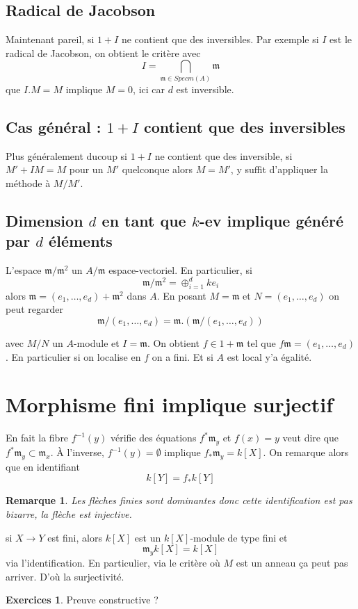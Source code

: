 \documentclass[a4paper,12pt]{book}
\newcommand{\m}{\mathfrak{m}}
\theoremstyle{plain}
\newtheorem{rem}{Remarque}
\theoremstyle{definition}
\newtheorem{exo}[subsection]{Exercices}
\theoremstyle{remark}
\begin{document}
\subsection{Radical de Jacobson}

Maintenant pareil, si $1+I$ ne contient que des inversibles. 
Par exemple si $I$ est le radical de Jacobson, on obtient le critère 
avec \[I=\bigcap_{\m\in Specm(A)} \m\]
que $I.M=M$ implique $M=0$, ici car $d$ est inversible.
\subsection{Cas général : $1+I$ contient que des inversibles}
Plus généralement ducoup si $1+I$
ne contient que des inversible, si $M'+IM=M$ pour un $M'$ quelconque 
alors $M=M'$, y suffit d'appliquer la méthode à $M/M'$.

\subsection{Dimension $d$ en tant que $k$-ev implique généré par
$d$ éléments}
L'espace $\m/\m^2$ un $A/\m$ espace-vectoriel. En particulier, si
\[\m/\m^2=\oplus_{i=1}^d ke_i\]
alors $\m=(e_1,\ldots,e_d)+\m^2$ dans $A$. En posant $M=\m$ et 
$N=(e_1,\ldots, e_d)$ on peut regarder
\[\m/(e_1,\ldots,e_d)=\m.(\m/(e_1,\ldots,e_d))\]

avec $M/N$ un $A$-module et $I=\m$. On obtient $f\in 1+\m$ tel que
$f\m=(e_1,\ldots,e_d)$. En particulier si on localise en $f$ on a fini.
Et si $A$ est local y'a égalité.

\section{Morphisme fini implique surjectif}
En fait la fibre $f^{-1}(y)$ vérifie des équations $f^*\m_y$ et 
$f(x)=y$ veut dire que $f^*\m_y\subset \m_x$. À l'inverse, 
$f^{-1}(y)=\emptyset$ implique $f_*\m_y=k[X]$.
On remarque alors que en identifiant 
\[k[Y]=f_*k[Y]\]
\begin{rem}
    Les flèches finies sont dominantes donc cette identification est pas
    bizarre, la flèche est injective.
\end{rem}
si $X\to Y$ est fini, alors $k[X]$ est un $k[X]$-module de type fini
et \[\m_yk[X]=k[X]\] via l'identification. En particulier, via le 
critère où $M$ est un anneau ça peut pas arriver. D'où la surjectivité.

\begin{exo}
    Preuve constructive ?
\end{exo}
\end{document}
